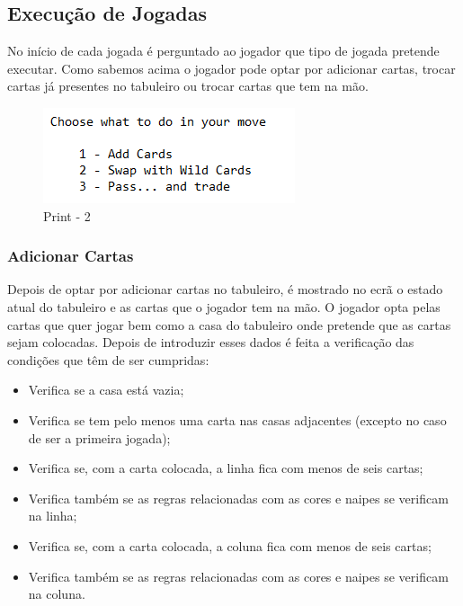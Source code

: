 \documentclass[a4paper]{article}
\begin{document}
	\subsection{Execução de Jogadas}

	No início de cada jogada é perguntado ao jogador que tipo de jogada pretende executar. Como sabemos acima o jogador pode optar por adicionar cartas, trocar cartas já presentes no tabuleiro ou trocar cartas que tem na mão.

	\begin{figure}[ht!]
	\centering
	\includegraphics[scale = 0.8]{./res/print2.png}
	\caption{Print - 2 \label{Print - 2}}
	\end{figure}

	\subsubsection{Adicionar Cartas}

	Depois de optar por adicionar cartas no tabuleiro, é mostrado no ecrã o estado atual do tabuleiro e as cartas que o jogador tem na mão. O jogador opta pelas cartas que quer jogar bem como a casa do tabuleiro onde pretende que as cartas sejam colocadas. Depois de introduzir esses dados é feita a verificação das condições que têm de ser cumpridas:

	\begin{itemize}
		\item 	Verifica se a casa está vazia;
		\item Verifica se tem pelo menos uma carta nas casas adjacentes (excepto no caso de ser a primeira jogada);
		\item Verifica se, com a carta colocada, a linha fica com menos de seis cartas;
		\item Verifica também se as regras relacionadas com as cores e naipes se verificam na linha;
		\item Verifica se, com a carta colocada, a coluna fica com menos de seis cartas;
		\item Verifica também se as regras relacionadas com as cores e naipes se verificam na coluna.
	\end{itemize}

	\lstset{  title=Código - 4}
	
\end{document}
